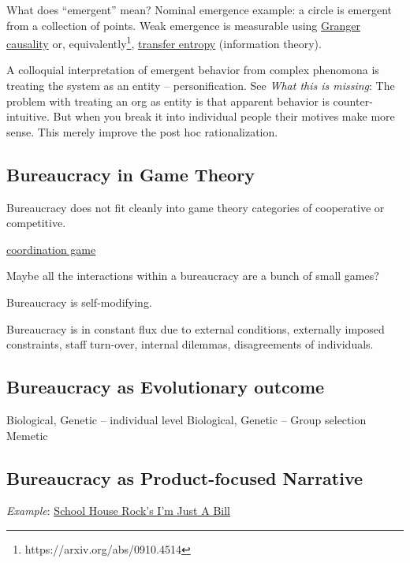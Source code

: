 What does ``emergent'' mean? Nominal emergence example: a circle is emergent from a collection of points. Weak emergence is measurable using \href{https://en.wikipedia.org/wiki/Granger_causality}{Granger causality} or, equivalently\footnote{https://arxiv.org/abs/0910.4514}, \href{https://en.wikipedia.org/wiki/Transfer_entropy}{transfer entropy} (information theory). 


A colloquial interpretation of emergent behavior from complex phenomona is treating the system as an entity -- personification.
See \cite{2002_Gall}
\textit{What this is missing}: The problem with treating an org as entity is that apparent behavior is counter-intuitive. But when you break it into individual people their motives make more sense. This merely improve the post hoc rationalization. 

\subsection{Bureaucracy in Game Theory}
Bureaucracy does not fit cleanly into game theory categories of cooperative or competitive.

\href{https://en.wikipedia.org/wiki/Coordination_game}{coordination game}

Maybe all the interactions within a bureaucracy are a bunch of small games?

Bureaucracy is self-modifying. 

Bureaucracy is in constant flux due to external conditions, externally imposed constraints, staff turn-over, internal dilemmas, disagreements of individuals. 




\subsection{Bureaucracy as Evolutionary outcome}

Biological, Genetic -- individual level
Biological, Genetic -- Group selection
Memetic

\subsection{Bureaucracy as Product-focused Narrative}
\textit{Example}: \href{https://www.youtube.com/watch?v=OgVKvqTItto}{School House Rock's I'm Just A Bill}\\

